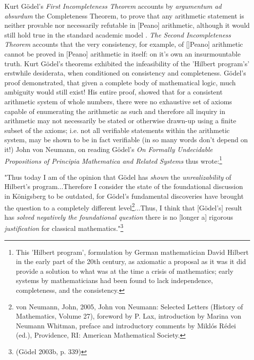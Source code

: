 \documentclass[7pt]{article}
\begin{document}
Kurt Gödel's \textit{First Incompleteness Theorem} accounts by \textit{argumentum ad absurdum} {the Completeness Theorem}, to prove that any arithmetic statement  is neither provable nor necessarily refutable in [Peano] arithmetic, although it would still hold true in the standard academic model . \textit{The Second Incompleteness Theorem} accounts that the very consistency, for example, of []Peano] arithmetic cannot be proved in [Peano] arithmetic in itself: on it's own an insurmountable truth. Kurt Gödel's theorems exhibited the infeasibility of the 'Hilbert program's' erstwhile desiderata, when conditioned on consistency and completeness. Gödel's proof demonstrated, that given a complete body of mathematical logic, much ambiguity would still exist! His entire proof, showed that for a consistent arithmetic system of whole numbers, there were no exhaustive set of axioms capable of enumerating the arithmetic as such and therefore all inquiry in arithmetic may not necessarily be stated or otherwise drawn-up using a finite subset of the axioms; i.e. not all verifiable statements within the arithmetic system, may be shown to be in fact verifiable (\textemdash in so many words don't depend on it!) John von Neumann, on reading Gödel's \textit{On Formally Undecidable Propositions of Principia Mathematica and Related Systems} thus wrote:\footnote{This  'Hilbert program', formulation by German mathematician David Hilbert in the early part of the 20th century, as  axiomatic a proposal as it was it did provide a solution to what was at the time a crisis of mathematics; early systems by mathematicians had been found to lack independence, completeness, and the consistency.}

\vspace{0.25cm}
\relax
{}\relax

"Thus today I am of the opinion that Gödel has \emph{shown} the \emph{unrealizability} of Hilbert's program...Therefore I consider the state of the foundational discussion in Königsberg to be outdated, for Gödel's fundamental discoveries have brought the question to a completely different level\footnote{von Neumann, John, 2005, John von Neumann: Selected Letters (History of Mathematics, Volume 27), foreword by P. Lax, introduction by Marina von Neumann Whitman, preface and introductory comments by Miklós Rédei (ed.), Providence, RI: American Mathematical Society.}...Thus, I think that [Gödel's] result has \emph{solved negatively the foundational question} \textemdash there is no [longer a] rigorous \emph{justification} for classical mathematics."\footnote{(Gödel 2003b, p. 339)}
\end{document}
